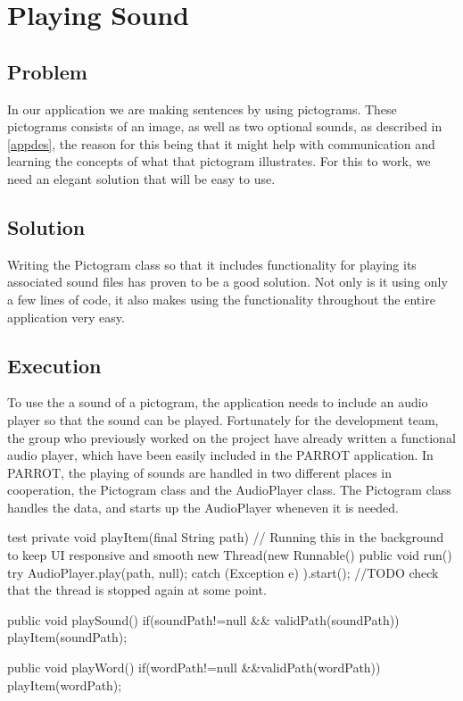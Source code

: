 \section{Playing Sound}
\subsection*{Problem}
In our application we are making sentences by using pictograms. These pictograms consists of an image, as well as two optional sounds, as described in \autoref{appdes}, the reason for this being that it might help with communication and learning the concepts of what that pictogram illustrates.
For this to work, we need an elegant solution that will be easy to use.

\subsection*{Solution}
Writing the Pictogram class so that it includes functionality for playing its associated sound files has proven to be a good solution. Not only is it using only a few lines of code, it also makes using the functionality throughout the entire application very easy.

\subsection*{Execution}
To use the a sound of a pictogram, the application needs to include an audio player so that the sound can be played. Fortunately for the development team, the group who previously worked on the project have already written a functional audio player, which have been easily included in the PARROT application.\newline
In PARROT, the playing of sounds are handled in two different places in cooperation, the Pictogram class and the AudioPlayer class.\newline
The Pictogram class handles the data, and starts up the AudioPlayer wheneven it is needed.\newline

\begin{source}{test}{}
	private void playItem(final String path) {
		// Running this in the background to keep UI responsive and smooth
		new Thread(new Runnable() {
			public void run() {
				try {
					AudioPlayer.play(path, null);
				} catch (Exception e) {
				}
			}
		}).start();
		//TODO check that the thread is stopped again at some point.
	}

	public void playSound()
	{
		if(soundPath!=null && validPath(soundPath))
		{
			playItem(soundPath);
		}
	}

	public void playWord()
	{
		if(wordPath!=null &&validPath(wordPath))
		{
			playItem(wordPath);
		}
	}
\end{source}

